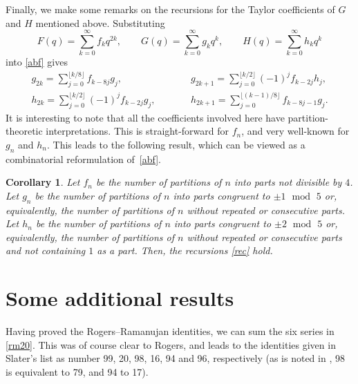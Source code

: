 \documentclass[pdftex]{sigma}
\numberwithin{equation}{section}
\newtheorem{Corollary}[Theorem]{Corollary}
\begin{document}
Finally, we make some remarks on the
 recursions for the Taylor coefficients of $G$ and $H$ mentioned above.
Substituting
\begin{equation*}F(q)=\sum_{k=0}^\infty f_kq^{2k},\qquad G(q)=\sum_{k=0}^\infty g_kq^k,\qquad H(q)=\sum_{k=0}^\infty h_kq^k\end{equation*}
into \eqref{abf} gives
\begin{subequations}\label{rec}
\begin{alignat}{3}%
& g_{2k}=\sum_{j=0}^{\lfloor k/8\rfloor}f_{k-8j}g_j,\qquad&&
g_{2k+1}=\sum_{j=0}^{\lfloor k/2\rfloor}(-1)^jf_{k-2j}h_j,&\\
& h_{2k}=\sum_{j=0}^{\lfloor k/2\rfloor}(-1)^jf_{k-2j}g_j,\qquad&&
h_{2k+1}=\sum_{j=0}^{\lfloor (k-1)/8\rfloor}f_{k-8j-1}g_j.&
\end{alignat}
\end{subequations}
It is interesting to note that all the coefficients involved here have partition-theoretic interpretations. This is straight-forward for $f_n$, and very well-known for $g_n$ and $h_n$.
This leads to the following result, which can be viewed as a combinatorial reformulation of~\eqref{abf}.

\begin{Corollary}
Let $f_n$ be the number of partitions of $n$ into parts not divisible by $4$.
Let $g_n$ be the number of partitions of $n$ into parts congruent to $\pm 1$ $\operatorname{mod}$ $5$ or, equivalently, the number of partitions
of $n$ without repeated or consecutive parts. Let $h_n$ be
the number of partitions of $n$ into parts congruent to $\pm 2$ $\operatorname{mod}$ $5$ or, equivalently, the number of partitions
of $n$ without repeated or consecutive parts and not containing $1$ as a part. Then, the recursions \eqref{rec} hold.
\end{Corollary}

\section{Some additional results}\label{ois}

Having proved the Rogers--Ramanujan identities, we can sum the six series in \eqref{rm20}. This was of course clear to Rogers, and leads to the identities
given in Slater's list \cite{msz,si,s} as number 99, 20, 98, 16, 94 and 96, respectively (as is noted in \cite{si}, 98 is equivalent to 79, and 94 to 17).
\end{document}
